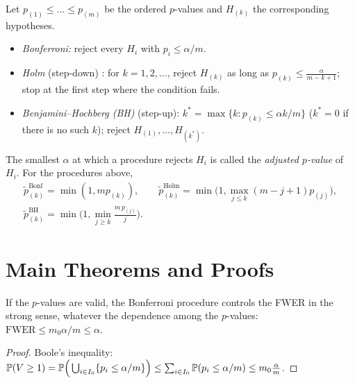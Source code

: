 \documentclass[main.tex]{subfiles}
\begin{document}
\begin{definition}\label{def:prosedurler}
Let $p_{(1)}\le\dots\le p_{(m)}$ be the ordered $p$-values and $H_{(k)}$ the corresponding hypotheses.
\begin{itemize}
  \item \emph{Bonferroni:} reject every $H_i$ with $p_i\le\alpha/m$.
  \item \emph{Holm} (step-down) \cite{holm79}: for $k=1,2,\dots$, reject $H_{(k)}$ as long as $p_{(k)}\le\frac{\alpha}{m-k+1}$; stop at the first step where the condition fails.
  \item \emph{Benjamini--Hochberg (BH)} (step-up): $k^*=\max\{k:p_{(k)}\le\alpha k/m\}$ ($k^*=0$ if there is no such $k$); reject $H_{(1)},\dots,H_{(k^*)}$.
\end{itemize}
\end{definition}

\begin{definition}\label{def:duzeltilmis-p}
The smallest $\alpha$ at which a procedure rejects $H_i$ is called the \emph{adjusted $p$-value} of $H_i$. For the procedures above,
\begin{gather*}
\tilde p_{(k)}^{\text{Bonf}}=\min(1,mp_{(k)}),\qquad
\tilde p_{(k)}^{\text{Holm}}=\min\Big(1,\max_{j\le k}(m-j+1)p_{(j)}\Big),\\
\tilde p_{(k)}^{\text{BH}}=\min\Big(1,\min_{j\ge k}\frac{m\,p_{(j)}}{j}\Big).
\end{gather*}
\end{definition}

\section{Main Theorems and Proofs}

\begin{theorem}[Bonferroni]\label{thm:bonferroni}
If the $p$-values are valid, the Bonferroni procedure controls the FWER in the strong sense, whatever the dependence among the $p$-values: $\mathrm{FWER}\le m_0\alpha/m\le\alpha$.
\end{theorem}
\begin{proof}
Boole's inequality: $\P(V\ge1)=\P\Big(\bigcup_{i\in I_0}\{p_i\le\alpha/m\}\Big)\le\sum_{i\in I_0}\P(p_i\le\alpha/m)\le m_0\frac\alpha m$.
\end{proof}
\end{document}
